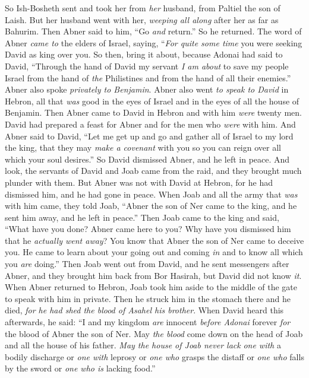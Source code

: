 \begin{biblechapter}
\verse So Ish-Bosheth sent and took her from \textit{her} husband, from Paltiel the son of Laish.
\verse But her husband went with her, \textit{weeping all along} after her as far as Bahurim. Then Abner said to him, “Go \textit{and} return.” So he returned.
\verse The word of Abner \textit{came to} the elders of Israel, saying, “\textit{For quite some time} you were seeking David as king over you.
\verse So then, bring it about, because Adonai had said to David, “Through the hand of David my servant \textit{I am about} to save my people Israel from the hand of \textit{the} Philistines and from the hand of all their enemies.”
\verse Abner also spoke \textit{privately to Benjamin}. Abner also went \textit{to speak to David} in Hebron, all that \textit{was} good in the eyes of Israel and in the eyes of all the house of Benjamin.
\verse Then Abner came to David in Hebron and with him \textit{were} twenty men. David had prepared a feast for Abner and for the men who \textit{were} with him.
\verse And Abner said to David, “Let me get up and go and gather all of Israel to my lord the king, that they may \textit{make a covenant} with you so you can reign over all which your soul desires.” So David dismissed Abner, and he left in peace.
\verse And look, the servants of David and Joab came from the raid, and they brought much plunder with them. But Abner was not with David at Hebron, for he had dismissed him, and he had gone in peace.
\verse When Joab and all the army that \textit{was} with him came, they told Joab, “Abner the son of Ner came to the king, and he sent him away, and he left in peace.”
 Then Joab came to the king and said, “What have you done? Abner came here to you? Why have you dismissed him that he \textit{actually went away}?
\verse You know that Abner the son of Ner came to deceive you. He came to learn about your going out and coming \textit{in} and to know all which you \textit{are} doing.”
\verse Then Joab went out from David, and he sent messengers after Abner, and they brought him back from Bor Hasirah, but David did not know \textit{it}.
\verse When Abner returned to Hebron, Joab took him aside to the middle of the gate to speak with him in private. Then he struck him in the stomach there and he died, \textit{for he had shed the blood of Asahel his brother}.
\verse When David heard this afterwards, he said: “I and my kingdom \textit{are} innocent \textit{before Adonai} forever \textit{for} the blood of Abner the son of Ner.
\verse May \textit{the blood} come down on the head of Joab and all the house of his father. \textit{May the house of Joab never lack} \textit{one with} a bodily discharge or \textit{one with} leprosy or \textit{one who} grasps the distaff or \textit{one who} falls by the sword or \textit{one who is} lacking food.”

\end{biblechapter}
